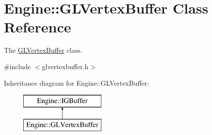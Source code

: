 \hypertarget{classEngine_1_1GLVertexBuffer}{}\section{Engine\+:\+:G\+L\+Vertex\+Buffer Class Reference}
\label{classEngine_1_1GLVertexBuffer}


The \hyperlink{classEngine_1_1GLVertexBuffer}{G\+L\+Vertex\+Buffer} class.  




{\ttfamily \#include $<$glvertexbuffer.\+h$>$}

Inheritance diagram for Engine\+:\+:G\+L\+Vertex\+Buffer\+:\begin{figure}[H]
\begin{center}
\leavevmode
\includegraphics[height=2.000000cm]{classEngine_1_1GLVertexBuffer}
\end{center}
\end{figure}
